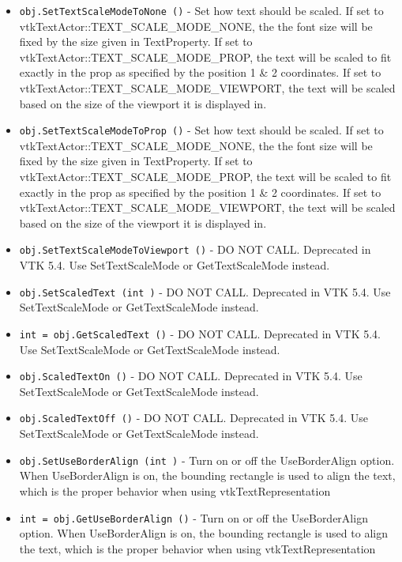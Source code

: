\begin{itemize}
\item  \verb|obj.SetTextScaleModeToNone ()| -  Set how text should be scaled.  If set to
 vtkTextActor::TEXT\_SCALE\_MODE\_NONE, the the font size will be fixed by the
 size given in TextProperty.  If set to vtkTextActor::TEXT\_SCALE\_MODE\_PROP,
 the text will be scaled to fit exactly in the prop as specified by the
 position 1 \& 2 coordinates.  If set to
 vtkTextActor::TEXT\_SCALE\_MODE\_VIEWPORT, the text will be scaled based on
 the size of the viewport it is displayed in.

\item  \verb|obj.SetTextScaleModeToProp ()| -  Set how text should be scaled.  If set to
 vtkTextActor::TEXT\_SCALE\_MODE\_NONE, the the font size will be fixed by the
 size given in TextProperty.  If set to vtkTextActor::TEXT\_SCALE\_MODE\_PROP,
 the text will be scaled to fit exactly in the prop as specified by the
 position 1 \& 2 coordinates.  If set to
 vtkTextActor::TEXT\_SCALE\_MODE\_VIEWPORT, the text will be scaled based on
 the size of the viewport it is displayed in.

\item  \verb|obj.SetTextScaleModeToViewport ()| -  DO NOT CALL.  Deprecated in VTK 5.4.  Use SetTextScaleMode or
 GetTextScaleMode instead.

\item  \verb|obj.SetScaledText (int )| -  DO NOT CALL.  Deprecated in VTK 5.4.  Use SetTextScaleMode or
 GetTextScaleMode instead.

\item  \verb|int = obj.GetScaledText ()| -  DO NOT CALL.  Deprecated in VTK 5.4.  Use SetTextScaleMode or
 GetTextScaleMode instead.

\item  \verb|obj.ScaledTextOn ()| -  DO NOT CALL.  Deprecated in VTK 5.4.  Use SetTextScaleMode or
 GetTextScaleMode instead.

\item  \verb|obj.ScaledTextOff ()| -  DO NOT CALL.  Deprecated in VTK 5.4.  Use SetTextScaleMode or
 GetTextScaleMode instead.

\item  \verb|obj.SetUseBorderAlign (int )| -  Turn on or off the UseBorderAlign option.
 When UseBorderAlign is on, the bounding rectangle is used to align the text,
 which is the proper behavior when using vtkTextRepresentation

\item  \verb|int = obj.GetUseBorderAlign ()| -  Turn on or off the UseBorderAlign option.
 When UseBorderAlign is on, the bounding rectangle is used to align the text,
 which is the proper behavior when using vtkTextRepresentation


\end{itemize}
